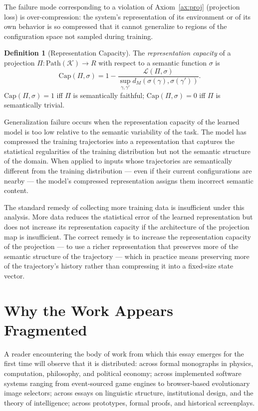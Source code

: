 \documentclass[12pt, twoside]{article}
\theoremstyle{plain}
\theoremstyle{definition}
\newtheorem{definition}[theorem]{Definition}
\theoremstyle{remark}
\newcommand{\Proj}{\Pi}
\begin{document}
The failure mode corresponding to a violation of
Axiom~\ref{ax:proj} (projection loss) is over-compression:
the system's representation of its environment or of its
own behavior is so compressed that it cannot generalize to
regions of the configuration space not sampled during training.

\begin{definition}[Representation Capacity]
The \emph{representation capacity} of a projection
$\Proj: \mathrm{Path}(\mathcal{K}) \to R$ with respect to
a semantic function $\sigma$ is
\[
  \mathrm{Cap}(\Proj, \sigma)
  = 1 - \frac{\mathcal{L}(\Proj, \sigma)}{\sup_{\gamma, \gamma'} d_M(\sigma(\gamma), \sigma(\gamma'))}.
\]
$\mathrm{Cap}(\Proj, \sigma) = 1$ iff $\Proj$ is semantically
faithful; $\mathrm{Cap}(\Proj, \sigma) = 0$ iff $\Proj$
is semantically trivial.
\end{definition}

Generalization failure occurs when the representation capacity
of the learned model is too low relative to the semantic variability
of the task.
The model has compressed the training trajectories into a
representation that captures the statistical regularities of the
training distribution but not the semantic structure of the domain.
When applied to inputs whose trajectories are semantically
different from the training distribution — even if their current
configurations are nearby — the model's compressed representation
assigns them incorrect semantic content.

The standard remedy of collecting more training data is
insufficient under this analysis.
More data reduces the statistical error of the learned representation
but does not increase its representation capacity if the
architecture of the projection map is insufficient.
The correct remedy is to increase the representation capacity
of the projection — to use a richer representation that preserves
more of the semantic structure of the trajectory —
which in practice means preserving more of the trajectory's history
rather than compressing it into a fixed-size state vector.

\newpage

\section{Why the Work Appears Fragmented}

A reader encountering the body of work from which this essay emerges
for the first time will observe that it is distributed:
across formal monographs in physics, computation, philosophy,
and political economy; across implemented software systems
ranging from event-sourced game engines to browser-based
evolutionary image selectors; across essays on linguistic structure,
institutional design, and the theory of intelligence;
across prototypes, formal proofs, and historical screenplays.
\end{document}
